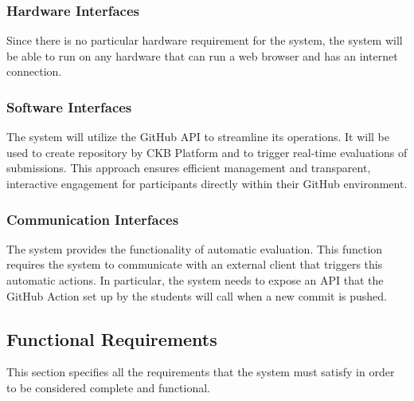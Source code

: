 \subsubsection{Hardware Interfaces}
Since there is no particular hardware requirement for the system, the system will be able to run on any hardware that can run a web browser and has an internet connection.

\subsubsection{Software Interfaces}
The system will utilize the GitHub API to streamline its operations. It will be used to create repository by CKB Platform and to trigger real-time evaluations of submissions. This approach ensures efficient management and transparent, interactive engagement for participants directly within their GitHub environment.

\subsubsection{Communication Interfaces}
The system provides the functionality of automatic evaluation. This function requires the system to communicate with an external client that triggers this automatic actions. In particular, the system needs to expose an API that the GitHub Action set up by the students will call when a new commit is pushed.

\subsection{Functional Requirements}
This section specifies all the requirements that the system must satisfy in order to be considered complete and functional.

